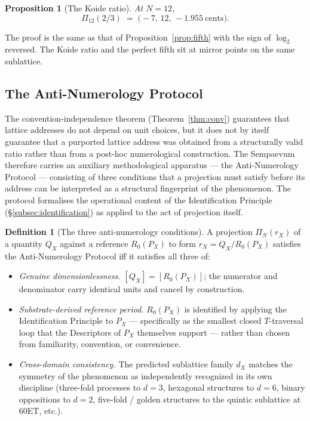 \documentclass[11pt,a4paper]{article}
\newtheorem{proposition}[theorem]{Proposition}
\theoremstyle{definition}
\newtheorem{definition}[theorem]{Definition}
\theoremstyle{remark}
\begin{document}
\begin{proposition}[The Koide ratio]\label{prop:koide}
At $N=12$,
\[
\Pi_{12}(2/3) \;=\; \bigl(-7,\,12,\,-1.955\ \text{cents}\bigr).
\]
\end{proposition}

The proof is the same as that of Proposition~\ref{prop:fifth} with the sign of $\log_{2}$ reversed. The Koide ratio and the perfect fifth sit at mirror points on the same sublattice.

\subsection{The Anti-Numerology Protocol}\label{subsec:anti-numerology}

The convention-independence theorem (Theorem~\ref{thm:conv}) guarantees that lattice addresses do not depend on unit choices, but it does not by itself guarantee that a purported lattice address was obtained from a structurally valid ratio rather than from a post-hoc numerological construction. The Sempaevum therefore carries an auxiliary methodological apparatus --- the Anti-Numerology Protocol --- consisting of three conditions that a projection must satisfy before its address can be interpreted as a structural fingerprint of the phenomenon. The protocol formalises the operational content of the Identification Principle (\S\ref{subsec:identification}) as applied to the act of projection itself.

\begin{definition}[The three anti-numerology conditions]\label{def:N1N2N3}
A projection $\Pi_{N}(r_{X})$ of a quantity $Q_{X}$ against a reference $R_{0}(P_{X})$ to form $r_{X} = Q_{X}/R_{0}(P_{X})$ satisfies the Anti-Numerology Protocol iff it satisfies all three of:
\begin{itemize}[leftmargin=*]
\item[\textbf{(N1)}] \emph{Genuine dimensionlessness.} $[Q_{X}] = [R_{0}(P_{X})]$; the numerator and denominator carry identical units and cancel by construction.
\item[\textbf{(N2)}] \emph{Substrate-derived reference period.} $R_{0}(P_{X})$ is identified by applying the Identification Principle to $P_{X}$ --- specifically as the smallest closed $T$-traversal loop that the Descriptors of $P_{X}$ themselves support --- rather than chosen from familiarity, convention, or convenience.
\item[\textbf{(N3)}] \emph{Cross-domain consistency.} The predicted sublattice family $d_{X}$ matches the symmetry of the phenomenon as independently recognized in its own discipline (three-fold processes to $d=3$, hexagonal structures to $d=6$, binary oppositions to $d=2$, five-fold / golden structures to the quintic sublattice at $60$ET, etc.).
\end{itemize}
\end{definition}
\end{document}
